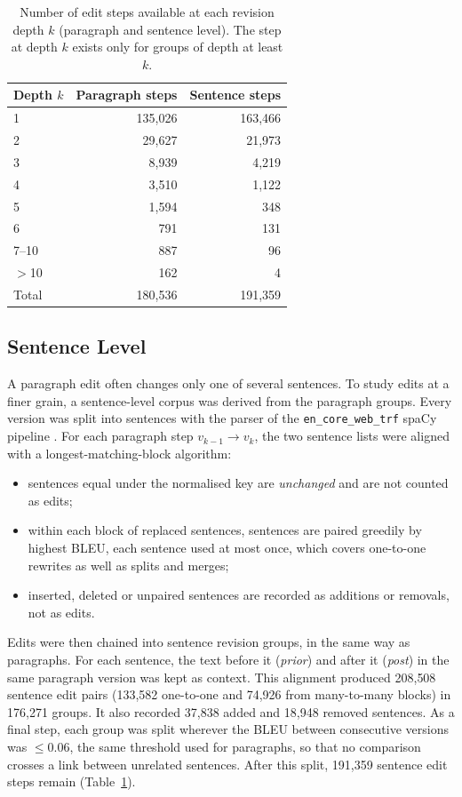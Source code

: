 \documentclass[12pt,a4paper,oneside]{report}
\begin{document}
\begin{table}[ht]
\centering
\small
\caption[Edit steps by revision depth]{Number of edit steps available at each revision depth $k$ (paragraph and sentence level). The step at depth $k$ exists only for groups of depth at least $k$.}
\label{tab:depth}
\begin{tabular}{@{}lrr@{}}
\toprule
Depth $k$ & Paragraph steps & Sentence steps\\
\midrule
1 & 135{,}026 & 163{,}466\\
2 & 29{,}627 & 21{,}973\\
3 & 8{,}939 & 4{,}219\\
4 & 3{,}510 & 1{,}122\\
5 & 1{,}594 & 348\\
6 & 791 & 131\\
7--10 & 887 & 96\\
$>$10 & 162 & 4\\
\midrule
Total & 180{,}536 & 191{,}359\\
\bottomrule
\end{tabular}
\end{table}

\subsection{Sentence Level}
A paragraph edit often changes only one of several sentences. To study edits at a finer grain, a sentence-level corpus was derived from the paragraph groups. Every version was split into sentences with the parser of the \texttt{en\_core\_web\_trf} spaCy pipeline \citep{honnibal2020}. For each paragraph step $v_{k-1}\to v_k$, the two sentence lists were aligned with a longest-matching-block algorithm:
\begin{itemize}
  \item sentences equal under the normalised key are \emph{unchanged} and are not counted as edits;
  \item within each block of replaced sentences, sentences are paired greedily by highest BLEU, each sentence used at most once, which covers one-to-one rewrites as well as splits and merges;
  \item inserted, deleted or unpaired sentences are recorded as additions or removals, not as edits.
\end{itemize}
Edits were then chained into sentence revision groups, in the same way as paragraphs. For each sentence, the text before it (\emph{prior}) and after it (\emph{post}) in the same paragraph version was kept as context. This alignment produced 208{,}508 sentence edit pairs (133{,}582 one-to-one and 74{,}926 from many-to-many blocks) in 176{,}271 groups. It also recorded 37{,}838 added and 18{,}948 removed sentences. As a final step, each group was split wherever the BLEU between consecutive versions was $\le 0.06$, the same threshold used for paragraphs, so that no comparison crosses a link between unrelated sentences. After this split, 191{,}359 sentence edit steps remain (Table~\ref{tab:depth}).
\end{document}
